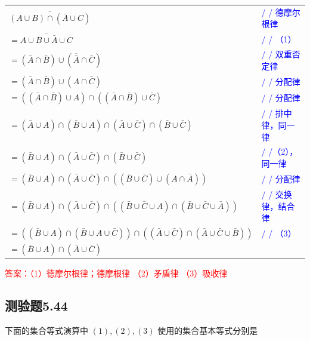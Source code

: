 \documentclass[UTF8, heading=true]{ctexart}
\begin{document}
\begin{table}[H]
  \centering
  \renewcommand{\arraystretch}{1.5}
  \begin{tabular}{ll}
    $\overline{(A \cup B) \cap (\bar{A} \cup C)}$ & \textcolor{blue}{/ / 德摩尔根律} \\
    $=\overline{A \cup B \cup \bar{A} \cup C}$ & \textcolor{blue}{/ / （1）} \\
    $=(\bar{A} \cap \bar{B}) \cup (\overline{\bar{A}} \cap \bar{C})$ & \textcolor{blue}{/ / 双重否定律} \\
    $=(\bar{A} \cap \bar{B}) \cup (A \cap \bar{C})$ & \textcolor{blue}{/ / 分配律} \\
    $=((\bar{A} \cap \bar{B}) \cup A) \cap ((\bar{A} \cap \bar{B}) \cup \bar{C})$ & \textcolor{blue}{/ / 分配律} \\
    $=(\bar{A} \cup A) \cap (\bar{B} \cup A) \cap (\bar{A} \cup \bar{C}) \cap (\bar{B} \cup \bar{C})$ & \textcolor{blue}{/ / 排中律，同一律} \\
    $=(\bar{B} \cup A) \cap (\bar{A} \cup \bar{C}) \cap (\bar{B} \cup \bar{C})$ & \textcolor{blue}{/ /（2），同一律} \\
    $=(\bar{B} \cup A) \cap (\bar{A} \cup \bar{C}) \cap ((\bar{B} \cup \bar{C}) \cup (A \cap \bar{A}))$ & \textcolor{blue}{/ / 分配律} \\
    $=(\bar{B} \cup A) \cap (\bar{A} \cup \bar{C}) \cap ((\bar{B} \cup \bar{C} \cup A) \cap (\bar{B} \cup \bar{C} \cup \bar{A}))$ & \textcolor{blue}{/ / 交换律，结合律} \\
    $=((\bar{B} \cup A) \cap (\bar{B} \cup A \cup \bar{C})) \cap ((\bar{A} \cup \bar{C}) \cap (\bar{A} \cup \bar{C} \cup \bar{B}))$ & \textcolor{blue}{/ / （3）} \\
    $=(\bar{B} \cup A) \cap (\bar{A} \cup \bar{C})$ & \\
  \end{tabular}
\end{table}

\textcolor{red}
{
  答案：（1）徳摩尔根律；德摩根律
  （2）矛盾律
  （3）吸收律
}

\subsection{测验题5.44}

下面的集合等式演算中 $(1),(2),(3)$ 使用的集合基本等式分别是
\end{document}
